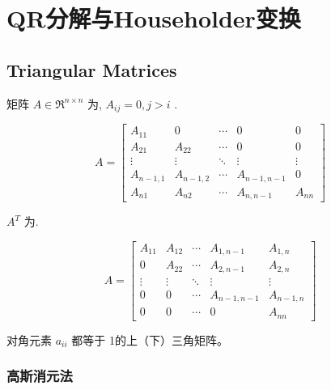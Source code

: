 \chapter{QR分解与Householder变换}

\section{Triangular Matrices}

\begin{definition}
    矩阵 $  {A} \in \mathfrak{R}^{n \times n} $ 为, $ A_{i j}=0, j>i $ .

    \begin{equation} A=\left[\begin{array}{ccccc}A_{11} & 0 & \cdots & 0 & 0 \\ A_{21} & A_{22} & \cdots & 0 & 0 \\ \vdots & \vdots & \ddots & \vdots & \vdots \\ A_{n-1,1} & A_{n-1,2} & \cdots & A_{n-1, n-1} & 0 \\ A_{n 1} & A_{n 2} & \cdots & A_{n, n-1} & A_{n n}\end{array}\right] \end{equation}
\end{definition}

\begin{definition}
    $ A^{T} $ 为.

    \begin{equation} A=\left[\begin{array}{ccccc}A_{11} & A_{12} & \cdots & A_{1, n-1} & A_{1, n} \\ 0 & A_{22} & \cdots & A_{2, n-1} & A_{2, n} \\ \vdots & \vdots & \ddots & \vdots & \vdots \\ 0 & 0 & \cdots & A_{n-1, n-1} & A_{n-1, n} \\ 0 & 0 & \cdots & 0 & A_{n n}\end{array}\right] \end{equation}
\end{definition}

\begin{definition}
    对角元素 $ a_{i i} $ 都等于 1的上（下）三角矩阵。
\end{definition}

\subsection{高斯消元法}

